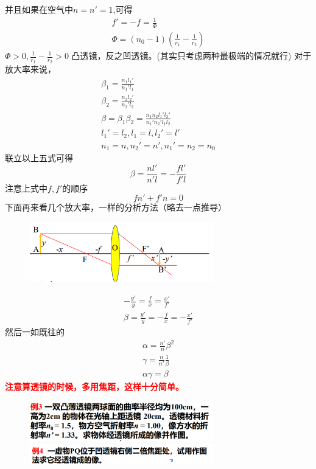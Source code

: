 并且如果在空气中$n=n'=1$,可得
\begin{align}
f'=-f=\frac{1}{\Phi} \tag{2.2.7.a}\\
\Phi=(n_0-1)(\frac{1}{r_1}-\frac{1}{r_2}) \tag{2.2.7.b}
\end{align}
$\displaystyle \Phi>0,\frac{1}{r_1}-\frac{1}{r_2}>0$ 凸透镜，反之凹透镜。(其实只考虑两种最极端的情况就行)
对于放大率来说，
\begin{align}
 \beta_1=\frac{n_1l_1'}{n_1'l_1} \tag{2.2.8.a}\\
 \beta_2=\frac{n_2l_2'}{n_2'l_2} \tag{2.2.8.b}\\
 \beta=\beta_1 \beta_2=\frac{n_1n_2l_1'l_2'}{n_1'n_2'l_1l_2} \tag{2.2.8.c}\\
 l_1'=l_2,l_1=l,l_2'=l'\tag{2.2.8.d}\\
 n_1=n,n_2'=n',n_1'=n_2=n_0\tag{2.2.8.e}
\end{align}
联立以上五式可得
\begin{equation}
\beta=\frac{nl'}{n'l}=-\frac{fl'}{f'l} \tag{2.2.9}
\end{equation}
注意上式中$f,f'$的顺序
$$
fn'+f'n=0
$$
下面再来看几个放大率，一样的分析方法（略去一点推导）
        \begin{figure}[H]
            \centering
            \includegraphics[width=8cm]{img/1.8.png}
            \end{figure}
            \begin{align}
                -\frac{y'}{y}=\frac{f}{x}=\frac{x'}{f'} \tag{2.2.10.a}\\
                \beta=\frac{y'}{y}=-\frac{f}{x}=-\frac{x'}{f'} \tag{2.2.10.b}
            \end{align}
            然后一如既往的
            \begin{align}
                \alpha=\frac{n'}{n}\beta^2 \tag{2.2.11.a}\\
                \gamma=\frac{n}{n'}\frac{1}{\beta}\tag{2.2.11.b}\\
                \alpha \gamma=\beta \tag{2.2.11.c}
            \end{align}
\textcolor{red}{\textbf{注意算透镜的时候，多用焦距，这样十分简单。}}
        \begin{figure}[H]
            \centering
            \includegraphics[width=8cm]{img/1.9.png}
            \includegraphics[width=8cm]{img/1.10.png}

            \end{figure}
